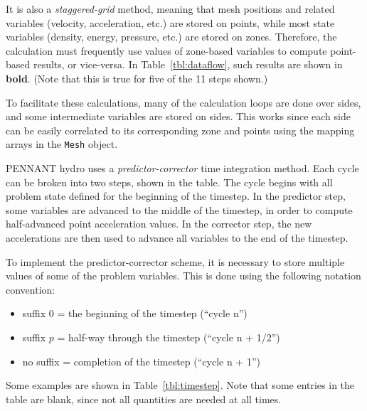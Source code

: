 \documentclass[11pt,letterpaper]{article} %
\begin{document}
It is also a {\em staggered-grid} method, meaning that mesh positions and
related variables (velocity, acceleration, etc.) are stored on points,
while most state variables (density, energy, pressure, etc.) are stored
on zones.  Therefore, the calculation must frequently use values of
zone-based variables to compute point-based results, or vice-versa.
In Table~\ref{tbl:dataflow}, such results are shown in {\bf bold}.
(Note that this is true for five of the 11 steps shown.)

To facilitate these calculations, many of the calculation loops are done
over sides, and some intermediate variables are stored on sides.
This works since each side can be easily correlated to its
corresponding zone and points using the mapping arrays in the {\tt Mesh}
object.

PENNANT hydro uses a {\em predictor-corrector} time integration
method.  Each cycle can be broken into two steps, shown in the table.
The cycle begins with all problem state defined for the beginning of the
timestep.  In the predictor step, some variables are advanced to the
middle of the timestep, in order to compute half-advanced point
acceleration values.  In the corrector step, the new accelerations are
then used to advance all variables to the end of the timestep.

To implement the predictor-corrector scheme, it is necessary to store
multiple values of some of the problem variables.  This is done
using the following notation convention:
\begin{itemize}
\item suffix $0$ = the beginning of the timestep (``cycle n'')
\item suffix $p$ = half-way through the timestep (``cycle n + 1/2'')
\item no suffix = completion of the timestep    (``cycle n + 1'')
\end{itemize}
Some examples are shown in Table~\ref{tbl:timestep}.
Note that some entries in the table are blank, since not all quantities
are needed at all times.
\end{document}
